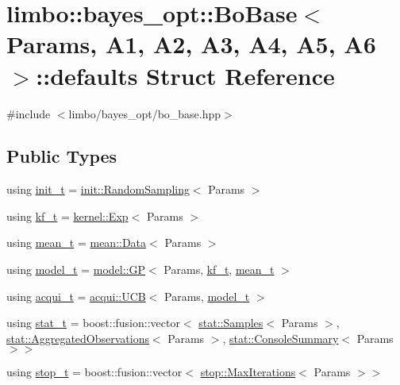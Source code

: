\hypertarget{structlimbo_1_1bayes__opt_1_1_bo_base_1_1defaults}{}\section{limbo\+:\+:bayes\+\_\+opt\+:\+:Bo\+Base$<$ Params, A1, A2, A3, A4, A5, A6 $>$\+:\+:defaults Struct Reference}
\label{structlimbo_1_1bayes__opt_1_1_bo_base_1_1defaults}


{\ttfamily \#include $<$limbo/bayes\+\_\+opt/bo\+\_\+base.\+hpp$>$}

\subsection*{Public Types}
\begin{DoxyCompactItemize}
\item 
using \hyperlink{structlimbo_1_1bayes__opt_1_1_bo_base_1_1defaults_afab889d523b8c28d1161079a5a453f79}{init\+\_\+t} = \hyperlink{structlimbo_1_1init_1_1_random_sampling}{init\+::\+Random\+Sampling}$<$ Params $>$
\item 
using \hyperlink{structlimbo_1_1bayes__opt_1_1_bo_base_1_1defaults_a74f559358b99209461a1aac1e0dacb1f}{kf\+\_\+t} = \hyperlink{structlimbo_1_1kernel_1_1_exp}{kernel\+::\+Exp}$<$ Params $>$
\item 
using \hyperlink{structlimbo_1_1bayes__opt_1_1_bo_base_1_1defaults_ae8b922abc8e126f785e1001342cf47ae}{mean\+\_\+t} = \hyperlink{structlimbo_1_1mean_1_1_data}{mean\+::\+Data}$<$ Params $>$
\item 
using \hyperlink{structlimbo_1_1bayes__opt_1_1_bo_base_1_1defaults_aa9a30c408b869fd46861b028b6325b4a}{model\+\_\+t} = \hyperlink{classlimbo_1_1model_1_1_g_p}{model\+::\+GP}$<$ Params, \hyperlink{structlimbo_1_1bayes__opt_1_1_bo_base_1_1defaults_a74f559358b99209461a1aac1e0dacb1f}{kf\+\_\+t}, \hyperlink{structlimbo_1_1bayes__opt_1_1_bo_base_1_1defaults_ae8b922abc8e126f785e1001342cf47ae}{mean\+\_\+t} $>$
\item 
using \hyperlink{structlimbo_1_1bayes__opt_1_1_bo_base_1_1defaults_a7728ece1763ffbcac4e37f219047dcb1}{acqui\+\_\+t} = \hyperlink{classlimbo_1_1acqui_1_1_u_c_b}{acqui\+::\+U\+CB}$<$ Params, \hyperlink{structlimbo_1_1bayes__opt_1_1_bo_base_1_1defaults_aa9a30c408b869fd46861b028b6325b4a}{model\+\_\+t} $>$
\item 
using \hyperlink{structlimbo_1_1bayes__opt_1_1_bo_base_1_1defaults_a3c475362a937e011e02c715e8edbf2d1}{stat\+\_\+t} = boost\+::fusion\+::vector$<$ \hyperlink{structlimbo_1_1stat_1_1_samples}{stat\+::\+Samples}$<$ Params $>$, \hyperlink{structlimbo_1_1stat_1_1_aggregated_observations}{stat\+::\+Aggregated\+Observations}$<$ Params $>$, \hyperlink{structlimbo_1_1stat_1_1_console_summary}{stat\+::\+Console\+Summary}$<$ Params $>$$>$
\item 
using \hyperlink{structlimbo_1_1bayes__opt_1_1_bo_base_1_1defaults_aabb9a88029b7b3cba6d1bafe3dfadaf5}{stop\+\_\+t} = boost\+::fusion\+::vector$<$ \hyperlink{structlimbo_1_1stop_1_1_max_iterations}{stop\+::\+Max\+Iterations}$<$ Params $>$$>$
\end{DoxyCompactItemize}


